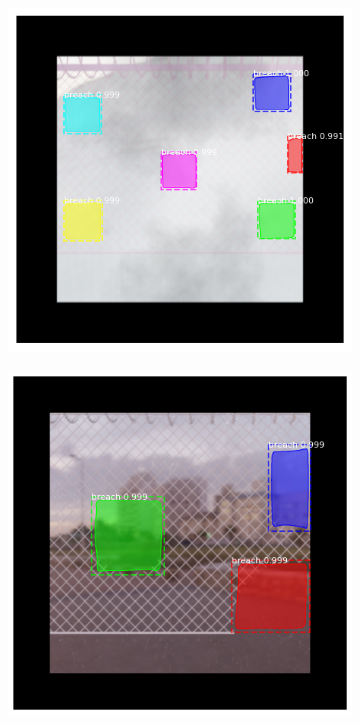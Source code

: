 \documentclass[../Head/Main.tex]{subfiles}
\begin{document}
\begin{figure}[H]
\begin{subfigure}{.23\textwidth}
        \caption{}
    \end{subfigure}
    \hfill
    \begin{subfigure}{.23\textwidth}
        \centering
        \includegraphics[width=\textwidth]{../Figures/rcnn_results/found_breaches/mask/4.png}
        \caption{}
    \end{subfigure}
    \hfill
    \begin{subfigure}{.23\textwidth}
        \centering
        \includegraphics[width=\textwidth]{../Figures/rcnn_results/found_breaches/mask/8.png}

\end{subfigure}
\end{figure}
\end{document}
